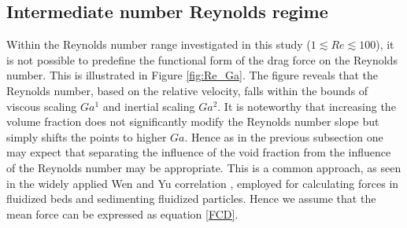 









\subsection{Intermediate number Reynolds regime}


Within the Reynolds number range investigated in this study ($1 \lesssim Re \lesssim 100$), it is not possible to predefine the functional form of the drag force on the Reynolds number. This is illustrated in Figure \ref{fig:Re_Ga}. The figure reveals that the Reynolds number, based on the relative velocity, falls within the bounds of viscous scaling $Ga^1$ and inertial scaling $Ga^2$. It is noteworthy that increasing the volume fraction does not significantly modify the Reynolds number slope but simply shifts the points to higher $Ga$. Hence as in the previous subsection one may expect that separating the influence of the void fraction from the influence of the Reynolds number may be appropriate. This is a common approach, as seen in the widely applied Wen and Yu correlation \citep{wen1966}, employed for calculating forces in fluidized beds and sedimenting fluidized particles. Hence we assume that the mean force can be expressed as equation \ref{FCD}.



